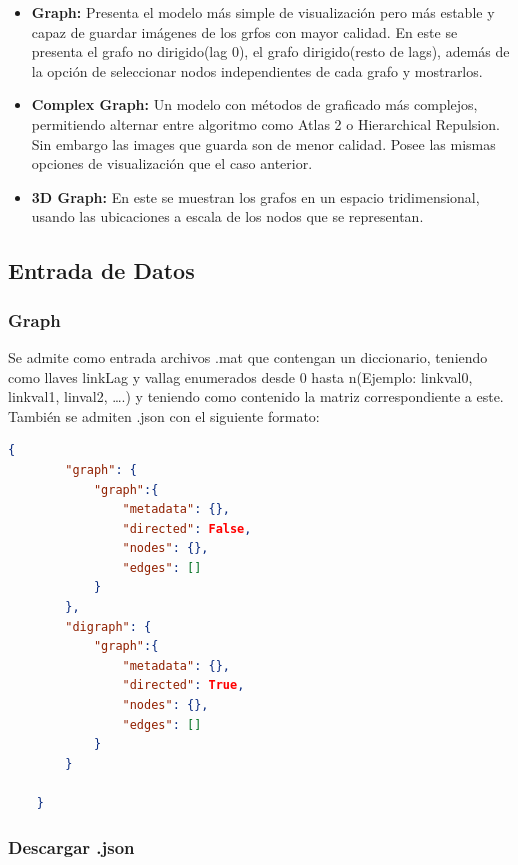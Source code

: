 \documentclass[spanish]{article}
\begin{document}
\begin{itemize}
    \item \textbf{Graph:} Presenta el modelo más simple de visualización pero más estable y capaz de guardar imágenes de los grfos con mayor calidad. En este se presenta el grafo no dirigido(lag 0), el grafo dirigido(resto de lags), además de la opción de seleccionar nodos independientes de cada grafo y mostrarlos.
    \item \textbf{Complex Graph:} Un modelo con métodos de graficado más complejos, permitiendo alternar entre algoritmo como Atlas 2 o Hierarchical Repulsion. Sin embargo las images que guarda son de menor calidad. Posee las mismas opciones de visualización que el caso anterior.
    \item \textbf{3D Graph:} En este se muestran los grafos en un espacio tridimensional, usando las ubicaciones a escala de los nodos que se representan.
\end{itemize}

\subsection*{Entrada de Datos}

\subsubsection*{Graph}

Se admite como entrada archivos .mat que contengan un diccionario, teniendo como llaves linkLag y vallag enumerados desde 0 hasta n(Ejemplo: linkval0, linkval1, linval2, ….) y teniendo como contenido la matriz correspondiente a este. También se admiten .json con el siguiente formato:


\begin{lstlisting}[language=json,firstnumber=1]
    {
        "graph": {
            "graph":{
                "metadata": {},
                "directed": False,
                "nodes": {},
                "edges": []
            }
        },
        "digraph": {
            "graph":{
                "metadata": {},
                "directed": True,
                "nodes": {},
                "edges": []
            }
        }
            
    }
    \end{lstlisting}


\subsubsection*{Descargar .json}
\end{document}
